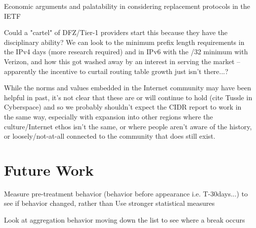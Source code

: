 Economic arguments and palatability in considering replacement protocols in the IETF

Could a "cartel" of DFZ/Tier-1 providers start this because they have the disciplinary ability? We can look to the minimum prefix length requirements in the IPv4 days (more research required) and in IPv6 with the /32 minimum with Verizon, and how this got washed away by an interest in serving the market -- apparently the incentive to curtail routing table growth just isn't there...?

While the norms and values embedded in the Internet community may have been helpful in past, it's not clear that these are or will continue to hold (cite Tussle in Cyberspace) and so we probably shouldn't expect the CIDR report to work in the same way, especially with expansion into other regions where the culture/Internet ethos isn't the same, or where people aren't aware of the history, or loosely/not-at-all connected to the community that does still exist.

\section{Future Work}
Measure pre-treatment behavior (behavior before appearance i.e. T-30days...) to see if behavior changed, rather than
Use stronger statistical measures

Look at aggregation behavior moving down the list to see where a break occurs
